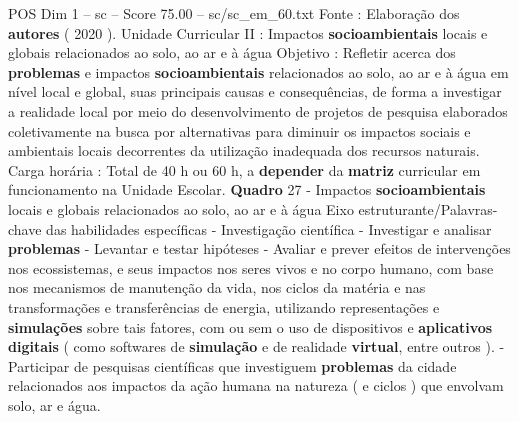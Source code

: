 \begin{textsample}{POS Dim 1 – sc – Score 75.00 – sc/sc\_em\_60.txt}
Fonte : Elaboração dos \textbf{autores} ( 2020 ).
Unidade Curricular II : Impactos \textbf{socioambientais} locais e globais relacionados ao solo, ao ar e à água Objetivo : Refletir acerca dos \textbf{problemas} e impactos \textbf{socioambientais} relacionados ao solo, ao ar e à água em nível local e global, suas principais causas e consequências, de forma a investigar a realidade local por meio do desenvolvimento de projetos de pesquisa elaborados coletivamente na busca por alternativas para diminuir os impactos sociais e ambientais locais decorrentes da utilização inadequada dos recursos naturais.
Carga horária : Total de 40 h ou 60 h, a \textbf{depender} da \textbf{matriz} curricular em funcionamento na Unidade Escolar. \textbf{Quadro} 27 - Impactos \textbf{socioambientais} locais e globais relacionados ao solo, ao ar e à água Eixo estruturante/Palavras-chave das habilidades específicas - Investigação científica - Investigar e analisar \textbf{problemas} - Levantar e testar hipóteses - Avaliar e prever efeitos de intervenções nos ecossistemas, e seus impactos nos seres vivos e no corpo humano, com base nos mecanismos de manutenção da vida, nos ciclos da matéria e nas transformações e transferências de energia, utilizando representações e \textbf{simulações} sobre tais fatores, com ou sem o uso de dispositivos e \textbf{aplicativos} \textbf{digitais} ( como softwares de \textbf{simulação} e de realidade \textbf{virtual}, entre outros ). - Participar de pesquisas científicas que investiguem \textbf{problemas} da cidade relacionados aos impactos da ação humana na natureza ( e ciclos ) que envolvam solo, ar e água.

\end{textsample}
